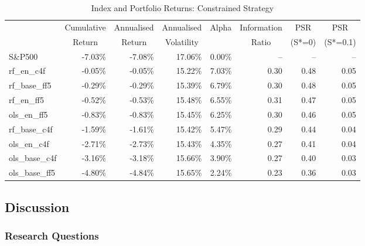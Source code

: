 \begin{table}[H]
\centering
\caption{Index and Portfolio Returns: Constrained Strategy}
\label{tab:constr}
\begin{tabular}{lrrrrrrr}
\toprule
{} & \multicolumn{1}{c}{Cumulative} & \multicolumn{1}{c}{Annualised} & \multicolumn{1}{c}{Annualised} & \multicolumn{1}{c}{Alpha} & \multicolumn{1}{c}{Information} & \multicolumn{1}{c}{PSR} & \multicolumn{1}{c}{PSR} \\
{} & \multicolumn{1}{c}{Return} & \multicolumn{1}{c}{Return} & \multicolumn{1}{c}{Volatility} & {} & \multicolumn{1}{c}{Ratio} & \multicolumn{1}{c}{(S*=0)} & \multicolumn{1}{c}{(S*=0.1)} \\
\midrule
S\&P500 & -7.03\% & -7.08\% & 17.06\% & 0.00\% & -- & -- & -- \\
rf\_en\_c4f & -0.05\% & -0.05\% & 15.22\% & 7.03\% & 0.30 & 0.48 & 0.05 \\
rf\_base\_ff5 & -0.29\% & -0.29\% & 15.39\% & 6.79\% & 0.30 & 0.48 & 0.05 \\
rf\_en\_ff5 & -0.52\% & -0.53\% & 15.48\% & 6.55\% & 0.31 & 0.47 & 0.05 \\
ols\_en\_ff5 & -0.83\% & -0.83\% & 15.45\% & 6.25\% & 0.30 & 0.46 & 0.05 \\
rf\_base\_c4f & -1.59\% & -1.61\% & 15.42\% & 5.47\% & 0.29 & 0.44 & 0.04 \\
ols\_en\_c4f & -2.71\% & -2.73\% & 15.43\% & 4.35\% & 0.27 & 0.41 & 0.04 \\
ols\_base\_c4f & -3.16\% & -3.18\% & 15.66\% & 3.90\% & 0.27 & 0.40 & 0.03 \\
ols\_base\_ff5 & -4.80\% & -4.84\% & 15.65\% & 2.24\% & 0.23 & 0.36 & 0.03 \\
\bottomrule
\end{tabular}
\end{table}

\subsection{Discussion}
\subsubsection{Research Questions}


